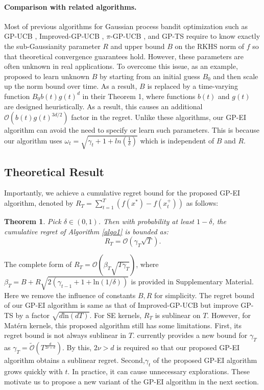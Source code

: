 \documentclass[twoside]{article}
\newtheorem{theorem}{Theorem}
\begin{document}
\paragraph{Comparison with related algorithms.} Most of previous algorithms for Gaussian process bandit optimization such as GP-UCB \cite{Srinivas12}, Improved-GP-UCB \citep{Chowdhury17}, $\pi$-GP-UCB \citep{janz20a}, and GP-TS \citep{Chowdhury17} require to know exactly the sub-Gaussianity parameter $R$ and upper bound $B$ on the RKHS norm of $f$ so that theoretical convergence guarantees hold. However, these parameters are often unknown in real applications. To overcome this issue, as an example, \citet{Berkenkamp19} proposed to learn unknown $B$ by starting from an initial guess $B_0$  and then scale up the norm bound over time. As a result, $B$ is replaced by a time-varying function
$B_0b(t)g(t)^d$ in their Theorem 1, where functions $b(t)$ and $g(t)$ are designed heuristically. As a result, this causes an additional $\mathcal O(b(t)g(t)^{3d/2})$ factor in the regret. Unlike these algorithms, our GP-EI algorithm can avoid the need to specify or learn such parameters. This is because our algorithm uses $\omega_t = \sqrt{\gamma_t + 1 + ln(\frac{1}{\delta})}$ which is independent of $B$ and $R$.
\subsection{Theoretical Result}
Importantly, we achieve a cumulative regret bound for the proposed GP-EI algorithm, denoted by $R_T = \sum_{t=1}^{T} (f(x^*) - f(x^+_t))$ as follows:
\begin{theorem}
Pick $\delta \in (0,1)$. Then with probability at least $1 - \delta$, the cumulative regret of Algorithm \ref{algo1} is bounded as:
$$R_T = \mathcal O(\gamma_T\sqrt{T}).$$
\label{theorem2}
\end{theorem}
The complete form of $R_T = \mathcal O(\beta_T\sqrt{T\gamma_T})$, where $\beta_T = B + R \sqrt{2(\gamma_{t-1} + 1 + \text{ln}(1/\delta))}$ is provided in Supplementary Material. Here we remove the influence of constants $B, R$ for simplicity. The regret bound of our GP-EI algorithm is same as that of Improved-GP-UCB \citep{Chowdhury17} but improve GP-TS \citep{Chowdhury17} by a factor $\sqrt{d\text{ln}(dT)}$. For SE kernels, $R_T$ is sublinear on $T$.  However, for Mat\'ern kernels, this proposed algorithm still has some limitations. First, its regret bound  is not always sublinear in $T$. \citet{vakili21a} currently provides a new bound for $\gamma_T$ as $\gamma_T = \tilde{\mathcal O}(T^{\frac{d}{2\nu + d}})$. By this, $2\nu > d$ is required so that our proposed GP-EI algorithm obtains a sublinear regret. Second,$\gamma_t$ of the proposed GP-EI algorithm grows quickly with $t$. In practice, it can cause unnecessary explorations. These motivate us to propose a new variant of the GP-EI algorithm in the next section.
\end{document}
